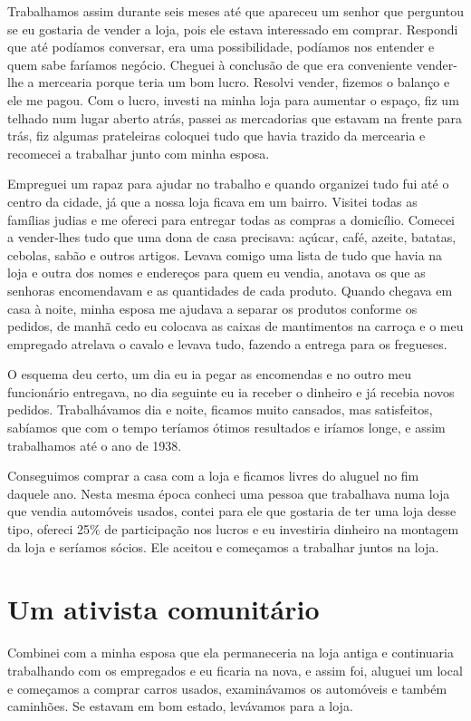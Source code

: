 Trabalhamos assim durante seis meses até que apareceu um senhor que
perguntou se eu gostaria de vender a loja, pois ele estava interessado
em comprar. Respondi que até podíamos conversar, era uma possibilidade,
podíamos nos entender e quem sabe faríamos negócio. Cheguei à conclusão
de que era conveniente vender-lhe a mercearia porque teria um bom lucro.
Resolvi vender, fizemos o balanço e ele me pagou. Com o lucro, investi
na minha loja para aumentar o espaço, fiz um telhado num lugar aberto
atrás, passei as mercadorias que estavam na frente para trás, fiz
algumas prateleiras coloquei tudo que havia trazido da mercearia e
recomecei a trabalhar junto com minha esposa.

Empreguei um rapaz para ajudar no trabalho e quando organizei tudo fui
até o centro da cidade, já que a nossa loja ficava em um bairro. Visitei
todas as famílias judias e me ofereci para entregar todas as compras a
domicílio. Comecei a vender-lhes tudo que uma dona de casa precisava:
açúcar, café, azeite, batatas, cebolas, sabão e outros artigos. Levava
comigo uma lista de tudo que havia na loja e outra dos nomes e endereços
para quem eu vendia, anotava os que as senhoras encomendavam e as
quantidades de cada produto. Quando chegava em casa à noite, minha
esposa me ajudava a separar os produtos conforme os pedidos, de manhã
cedo eu colocava as caixas de mantimentos na carroça e o meu empregado
atrelava o cavalo e levava tudo, fazendo a entrega para os fregueses.

O esquema deu certo, um dia eu ia pegar as encomendas e no outro meu
funcionário entregava, no dia seguinte eu ia receber o dinheiro e já
recebia novos pedidos. Trabalhávamos dia e noite, ficamos muito
cansados, mas satisfeitos, sabíamos que com o tempo teríamos ótimos
resultados e iríamos longe, e assim trabalhamos até o ano de 1938.

Conseguimos comprar a casa com a loja e ficamos livres do aluguel no fim
daquele ano. Nesta mesma época conheci uma pessoa que trabalhava numa
loja que vendia automóveis usados, contei para ele que gostaria de ter
uma loja desse tipo, ofereci 25\% de participação nos lucros e eu
investiria dinheiro na montagem da loja e seríamos sócios. Ele aceitou e
começamos a trabalhar juntos na loja.

\chapter{Um ativista comunitário}

Combinei com a minha esposa que ela permaneceria na loja antiga e
continuaria trabalhando com os empregados e eu ficaria na nova, e assim
foi, aluguei um local e começamos a comprar carros usados, examinávamos
os automóveis e também caminhões. Se estavam em bom estado, levávamos
para a loja.

